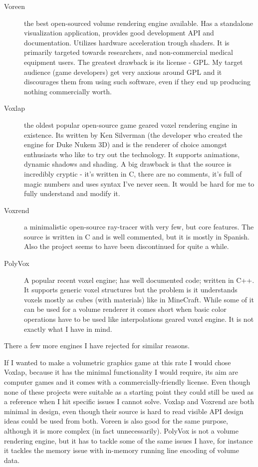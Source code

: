 \documentclass[11pt,fleqn,twoside]{article}
\begin{document}
\begin{description}
	\item[Voreen\cite{Volreen}]
	the best open-sourced volume rendering engine available. Has a standalone visualization application, provides good development API and documentation. Utilizes hardware acceleration trough shaders. It is primarily targeted towards researchers, and non-commercial medical equipment users. The greatest drawback is its license - GPL. My target audience (game developers) get very anxious around GPL and it discourages them from using such software, even if they end up producing nothing commercially worth.
	\item[Voxlap\cite{Voxlap}]
	the oldest popular open-source game geared voxel rendering engine in existence. Its written by Ken Silverman (the developer who created the engine for Duke Nukem 3D) and is the renderer of choice amongst enthusiasts who like to try out the technology. It supports animations, dynamic shadows and shading. A big drawback is that the source is incredibly cryptic - it's written in C, there are no comments, it's full of magic numbers and uses syntax I've never seen. It would be hard for me to fully understand and modify it.
	\item[Voxrend\cite{VoxRend}]
	a minimalistic open-source ray-tracer with very few, but core features. The source is written in C and is well commented, but it is mostly in Spanish. Also the project seems to have been discontinued for quite a while.
	\item[PolyVox\cite{PolyVox}]
	A popular recent voxel engine; has well documented code; written in C++. It supports generic voxel structures but the problem is it understands voxels mostly as cubes (with materials) like in MineCraft. While some of it can be used for a volume renderer it comes short when basic color operations have to be used like interpolations geared voxel engine. It is not exactly what I have in mind.
\end{description}

There a few more engines I have rejected for similar reasons.

If I wanted to make a volumetric graphics game at this rate I would chose Voxlap, because it has the minimal functionality I would require, its aim are computer games and it comes with a commercially-friendly license. Even though none of these projects were suitable as a starting point they could still be used as a reference when I hit specific issues I cannot solve. Voxlap and Voxrend are both minimal in design, even though their source is hard to read visible API design ideas could be used from both. Voreen is also good for the same purpose, although it is more complex (in fact unnecessarily). PolyVox is not a volume rendering engine, but it has to tackle some of the same issues I have, for instance it tackles the memory issue with in-memory running line encoding of volume data.
\end{document}
